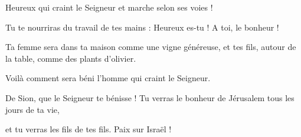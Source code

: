 \item Heureux qui craint le Seigneur et marche selon ses voies !

\item Tu te nourriras du travail de tes mains : Heureux es-tu ! A toi, le bonheur !

\item Ta femme sera dans ta maison comme une vigne généreuse, et tes fils, autour de la table, comme des plants d'olivier.

\item Voilà comment sera béni l'homme qui craint le Seigneur.

\item De Sion, que le Seigneur te bénisse ! Tu verras le bonheur de Jérusalem tous les jours de ta vie,

\item et tu verras les fils de tes fils. Paix sur Israël !
